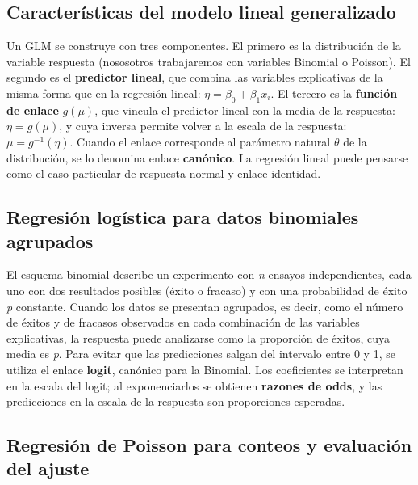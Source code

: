 \documentclass[
  spanish,
  letterpaper,
  DIV=11,
  numbers=noendperiod]{scrreprt}
\begin{document}
\subsection{Características del modelo lineal
generalizado}\label{caracteruxedsticas-del-modelo-lineal-generalizado}

Un GLM se construye con tres componentes. El primero es la distribución
de la variable respuesta (nososotros trabajaremos con variables Binomial
o Poisson). El segundo es el \textbf{predictor lineal}, que combina las
variables explicativas de la misma forma que en la regresión lineal:
\(\eta = \beta_0 + \beta_1 x_i\). El tercero es la \textbf{función de
enlace} \(g(\mu)\), que vincula el predictor lineal con la media de la
respuesta: \(\eta = g(\mu)\), y cuya inversa permite volver a la escala
de la respuesta: \(\mu = g^{-1}(\eta)\). Cuando el enlace corresponde al
parámetro natural \(\theta\) de la distribución, se lo denomina enlace
\textbf{canónico}. La regresión lineal puede pensarse como el caso
particular de respuesta normal y enlace identidad.

\subsection{Regresión logística para datos binomiales
agrupados}\label{regresiuxf3n-loguxedstica-para-datos-binomiales-agrupados}

El esquema binomial describe un experimento con \emph{n} ensayos
independientes, cada uno con dos resultados posibles (éxito o fracaso) y
con una probabilidad de éxito \emph{p} constante. Cuando los datos se
presentan agrupados, es decir, como el número de éxitos y de fracasos
observados en cada combinación de las variables explicativas, la
respuesta puede analizarse como la proporción de éxitos, cuya media es
\emph{p}. Para evitar que las predicciones salgan del intervalo entre 0
y 1, se utiliza el enlace \textbf{logit}, canónico para la Binomial. Los
coeficientes se interpretan en la escala del logit; al exponenciarlos se
obtienen \textbf{razones de odds}, y las predicciones en la escala de la
respuesta son proporciones esperadas.

\subsection{Regresión de Poisson para conteos y evaluación del
ajuste}\label{regresiuxf3n-de-poisson-para-conteos-y-evaluaciuxf3n-del-ajuste}
\end{document}
